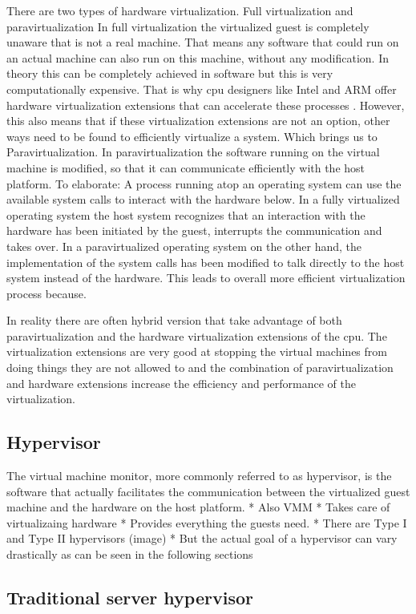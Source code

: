 There are two types of hardware virtualization. Full virtualization and paravirtualization
In full virtualization the virtualized guest is completely unaware that is not a real machine. That means any software that could run on an actual machine can also run on this machine, without any modification.
In theory this can be completely achieved in software but this is very computationally expensive. That is why \acrshort{cpu} designers like Intel and ARM offer hardware virtualization extensions that can accelerate these processes \cite{uhlig2005intel}. However, this also means that if these virtualization extensions are not an option, other ways need to be found to efficiently virtualize a system. Which brings us to Paravirtualization.
In paravirtualization the software running on the virtual machine is modified, so that it can communicate efficiently with the host platform. To elaborate: A process running atop an operating system can use the available system calls to interact with the hardware below. In a fully virtualized operating system the host system recognizes that an interaction with the hardware has been initiated by the guest, interrupts the communication and takes over. In a paravirtualized operating system on the other hand, the implementation of the system calls has been modified to talk directly to the host system instead of the hardware. This leads to overall more efficient virtualization process because.

In reality there are often hybrid version that take advantage of both paravirtualization and the hardware virtualization extensions of the \acrshort{cpu}. The virtualization extensions are very good at stopping the virtual machines from doing things they are not allowed to and the combination of paravirtualization and hardware extensions increase the efficiency and performance of the virtualization.
\subsection{Hypervisor}
The virtual machine monitor, more commonly referred to as hypervisor, is the software that actually facilitates the communication between the virtualized guest machine and the hardware on the host platform.
* Also VMM
* Takes care of virtualizaing hardware
* Provides everything the guests need. 
* There are Type I and Type II hypervisors (image)
* But the actual goal of a hypervisor can vary drastically as can be seen in the following sections
\subsection{Traditional server hypervisor}
